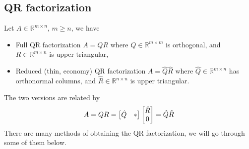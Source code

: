\documentclass{article}
\begin{document}
\subsection{QR factorization}
Let $A\in\mathbb{R}^{m\times n}$, $m\geq n$, we have
\begin{itemize}
    \item Full QR factorization $A=QR$ where $Q\in\mathbb{R}^{m\times m}$ is orthogonal, and $R\in\mathbb{R}^{m\times n}$ is upper triangular,
    \item Reduced (thin, economy) QR factorization $A=\hat{Q}\hat{R}$ where $\hat{Q}\in\mathbb{R}^{m\times n}$ has orthonormal columns, and $\hat{R}\in\mathbb{R}^{n\times n}$ is upper triangular.
\end{itemize}
The two versions are related by
\begin{equation}
    A=QR=
    \begin{bmatrix}
        \hat{Q} & \ast
    \end{bmatrix}
    \begin{bmatrix}{\hat{R}}\\{0}\end{bmatrix}=\hat{Q}\hat{R}
\end{equation}
There are many methods of obtaining the QR factorization, we will go through some of them below.
\end{document}

